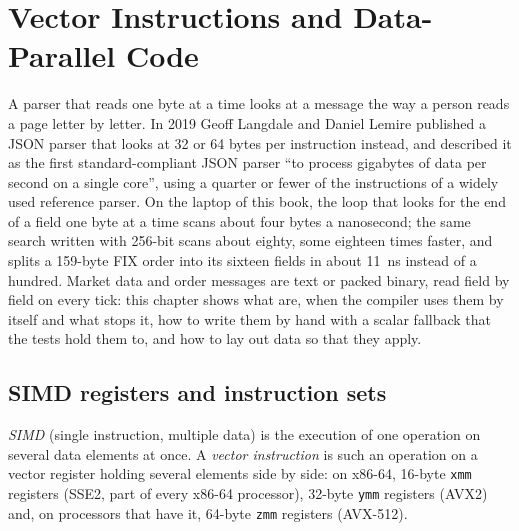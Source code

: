 \chapter{Vector Instructions and Data-Parallel Code}\label{ch:ll:vector-instructions-and-data-parallel-code}

A parser that reads one byte at a time looks at a message the way a person reads a page letter by letter. In 2019 Geoff
Langdale and Daniel Lemire published a JSON parser that looks at 32 or 64 bytes per instruction instead, and described it as
the first standard-compliant JSON parser ``to process gigabytes of data per second on a single core'', using a quarter or
fewer of the instructions of a widely used reference parser. On the laptop of this book, the loop that looks for the end of a
field one byte at a time scans about four bytes a nanosecond; the same search written with 256-bit  scans
about eighty, some eighteen times faster, and splits a 159-byte FIX order into its sixteen fields in about \qty{11}{\nano\second}
instead of a hundred. Market data and order messages are text or packed binary, read field by field on every tick: this
chapter shows what  are, when the compiler uses them by itself and what stops it, how to write them by
hand with a scalar fallback that the tests hold them to, and how to lay out data so that they apply.

\section{SIMD registers and instruction sets}

\begin{definition}\label{def:ll:vector-instructions-and-data-parallel-code:simd}
\emph{SIMD} (single instruction, multiple data) is the execution of one operation on several data elements at
once. A \emph{vector instruction} is such an operation on a vector register holding several
elements side by side: on x86-64, 16-byte \texttt{xmm} registers (SSE2, part of every x86-64 processor), 32-byte
\texttt{ymm} registers (AVX2) and, on processors that have it, 64-byte \texttt{zmm} registers (AVX-512).
\end{definition}

